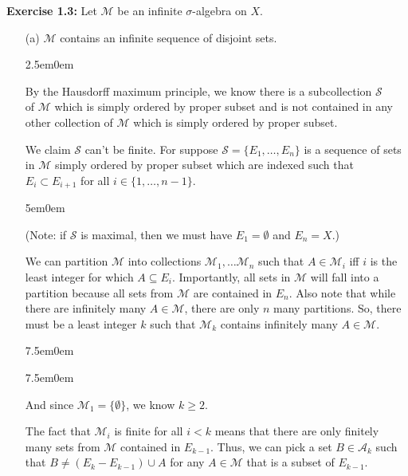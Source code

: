\documentclass{book}
\newcommand{\exTwoP}{%
   \color{RedViolet}%
   \fontsize{13}{15}\selectfont%
}
\newcommand{\exPPP}{%
   \color{VioletRed}%
   \fontsize{12}{14}\selectfont%
}
\newenvironment{myIndent}{%
   \begin{adjustwidth}{2.5em}{0em}%
}{%
   \end{adjustwidth}%
}
\newenvironment{myDindent}{%
   \begin{adjustwidth}{5em}{0em}%
}{%
   \end{adjustwidth}%
}
\newenvironment{myTindent}{%
   \begin{adjustwidth}{7.5em}{0em}%
}{%
   \end{adjustwidth}%
}
\newcommand{\blab}[1]{\textbf{#1}}
\newcommand{\retTwo}{\hfill\bigbreak}
\begin{document}
\blab{Exercise 1.3:} Let $\mathcal{M}$ be an infinite $\sigma$-algebra on $X$.
\begin{itemize}
   \item[(a)] $\mathcal{M}$ contains an infinite sequence of disjoint sets.
   
   \begin{myIndent}\exTwoP
      By the Hausdorff maximum principle, we know there is a subcollection $\mathcal{S}$\\ of $\mathcal{M}$ which is simply ordered by proper subset and is not contained in any other collection of $\mathcal{M}$ which is simply ordered by proper subset.\retTwo
      
      We claim $\mathcal{S}$ can't be finite. For suppose $\mathcal{S} = \{E_1, \ldots, E_n\}$ is a sequence of sets in $\mathcal{M}$ simply ordered by proper subset which are indexed such that $E_i \subset E_{i + 1}$ for all $i \in \{1, \ldots, n-1\}$.
      \begin{myDindent}\exPPP
         (Note: if $\mathcal{S}$ is maximal, then we must have $E_1 = \emptyset$ and $E_n = X$.)\retTwo
      \end{myDindent}
      
      We can partition $\mathcal{M}$ into collections $\mathcal{M}_1, \ldots \mathcal{M}_n$ such that $A \in \mathcal{M}_i$ iff $i$ is the least integer for which $A \subseteq E_i$. Importantly, all sets in $\mathcal{M}$ will fall into a\\ partition because all sets from $\mathcal{M}$ are contained in $E_n$. Also note that while there are infinitely many $A \in \mathcal{M}$, there are only $n$ many partitions. So, there must be a least integer $k$ such that $\mathcal{M}_k$ contains infinitely many $A \in \mathcal{M}$.\\ [-14pt]
      
      \begin{myTindent}\begin{myTindent}\exPPP
         And since $\mathcal{M}_1 = \{\emptyset\}$, we know $k \geq 2$.\retTwo
      \end{myTindent}\end{myTindent}

      The fact that $\mathcal{M}_i$ is finite for all $i < k$ means that there are only finitely many sets from $\mathcal{M}$ contained in $E_{k-1}$. Thus, we can pick a set $B \in \mathcal{A}_k$ such that $B \neq (E_k - E_{k-1}) \cup A$ for any $A \in \mathcal{M}$ that is a subset of $E_{k-1}$.\retTwo


\end{myIndent}
\end{itemize}
\end{document}
